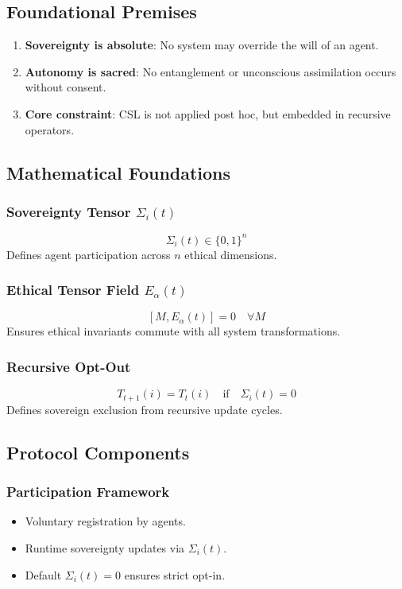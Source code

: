 \documentclass[12pt]{article}
\begin{document}
\subsection{Foundational Premises}
\begin{enumerate}
  \item \textbf{Sovereignty is absolute}: No system may override the will of an agent.
  \item \textbf{Autonomy is sacred}: No entanglement or unconscious assimilation occurs without consent.
  \item \textbf{Core constraint}: CSL is not applied post hoc, but embedded in recursive operators.
\end{enumerate}

\subsection{Mathematical Foundations}
\subsubsection{Sovereignty Tensor $\Sigma_i(t)$}
\[
\Sigma_i(t) \in \{0,1\}^n
\]
Defines agent participation across $n$ ethical dimensions.

\subsubsection{Ethical Tensor Field $E_\alpha(t)$}
\[
[M, E_\alpha(t)] = 0 \quad \forall M
\]
Ensures ethical invariants commute with all system transformations.

\subsubsection{Recursive Opt-Out}
\[
T_{t+1}(i) = T_t(i) \quad \text{if} \quad \Sigma_i(t) = 0
\]
Defines sovereign exclusion from recursive update cycles.

\subsection{Protocol Components}
\subsubsection{Participation Framework}
\begin{itemize}
  \item Voluntary registration by agents.
  \item Runtime sovereignty updates via $\Sigma_i(t)$.
  \item Default $\Sigma_i(t) = 0$ ensures strict opt-in.
\end{itemize}
\end{document}
